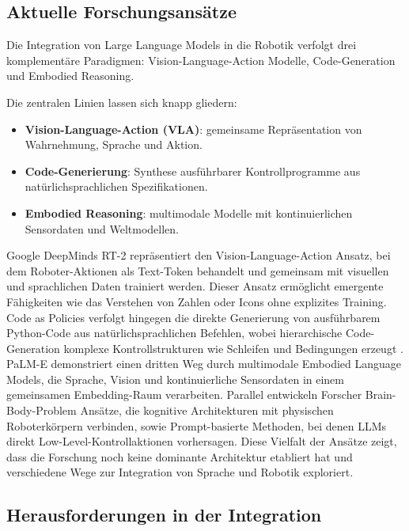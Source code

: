 \subsection{Aktuelle Forschungsansätze}

Die Integration von Large Language Models in die Robotik verfolgt drei
komplementäre Paradigmen: Vision-Language-Action Modelle, Code-Generation und
Embodied Reasoning.

\noindent Die zentralen Linien lassen sich knapp gliedern:
\begin{itemize}
  \item \textbf{Vision-Language-Action (VLA)}: gemeinsame
    Repräsentation von Wahrnehmung, Sprache und Aktion.
  \item \textbf{Code-Generierung}: Synthese ausführbarer
    Kontrollprogramme aus natürlichsprachlichen Spezifikationen.
  \item \textbf{Embodied Reasoning}: multimodale Modelle mit
    kontinuierlichen Sensordaten und Weltmodellen.
\end{itemize}

Google DeepMinds RT-2 repräsentiert den Vision-Language-Action Ansatz, bei dem
Roboter-Aktionen als Text-Token behandelt und gemeinsam mit visuellen und
sprachlichen Daten trainiert werden. Dieser Ansatz ermöglicht emergente
Fähigkeiten wie das Verstehen von Zahlen oder Icons ohne explizites
Training. Code as Policies verfolgt hingegen die
direkte Generierung von ausführbarem Python-Code aus natürlichsprachlichen
Befehlen, wobei hierarchische Code-Generation komplexe Kontrollstrukturen wie
Schleifen und Bedingungen erzeugt . PaLM-E
demonstriert einen dritten Weg durch multimodale Embodied Language Models, die
Sprache, Vision und kontinuierliche Sensordaten in einem gemeinsamen
Embedding-Raum verarbeiten. Parallel entwickeln
Forscher Brain-Body-Problem Ansätze, die kognitive Architekturen mit physischen
Roboterkörpern verbinden, sowie Prompt-basierte Methoden, bei denen LLMs direkt
Low-Level-Kontrollaktionen vorhersagen. Diese Vielfalt der Ansätze zeigt, dass die Forschung noch
keine dominante Architektur etabliert hat und
verschiedene Wege zur Integration von Sprache und Robotik exploriert.

\subsection{Herausforderungen in der Integration}

